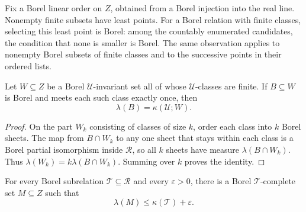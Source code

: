 Fix a Borel linear order on $Z$, obtained from a Borel injection into the
real line.  Nonempty finite subsets have least points.  For a Borel
relation with finite classes, selecting this least point is Borel: among
the countably enumerated candidates, the condition that none is smaller
is Borel.  The same observation applies to nonempty Borel subsets of
finite classes and to the successive points in their ordered lists.

\begin{lemma}\label{compression:counting}
Let $W\subseteq Z$ be a Borel $\mathcal U$-invariant set all of whose
$\mathcal U$-classes are finite.  If $B\subseteq W$ is Borel and meets
each such class exactly once, then
\[
 \lambda(B)=\kappa(\mathcal U;W).
\]
\end{lemma}

\begin{proof}
On the part $W_k$ consisting of classes of size $k$, order each class
into $k$ Borel sheets.  The map from $B\cap W_k$ to any one sheet that
stays within each class is a Borel partial isomorphism inside
$\mathcal R$, so all $k$ sheets have measure $\lambda(B\cap W_k)$.
Thus $\lambda(W_k)=k\lambda(B\cap W_k)$.  Summing over $k$ proves the
identity.
\end{proof}

\begin{lemma}\label{compression:complete-set}
For every Borel subrelation $\mathcal T\subseteq\mathcal R$ and every
$\varepsilon>0$, there is a Borel $\mathcal T$-complete set
$M\subseteq Z$ such that
\[
 \lambda(M)\leq\kappa(\mathcal T)+\varepsilon.
\]
\end{lemma}

